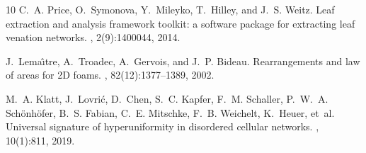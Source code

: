 \documentclass[10pt,twocolumn]{article}
\begin{document}
\begin{thebibliography}{10}
C.~A. Price, O.~Symonova, Y.~Mileyko, T.~Hilley, and J.~S. Weitz.
\newblock Leaf extraction and analysis framework toolkit: a software package for extracting leaf venation networks.
, 2(9):1400044, 2014.

J.~Lema{\^\i}tre, A.~Troadec, A.~Gervois, and J.~P. Bideau.
\newblock Rearrangements and law of areas for 2D foams.
, 82(12):1377--1389, 2002.

M.~A. Klatt, J.~Lovri{\'c}, D.~Chen, S.~C. Kapfer, F.~M. Schaller, P.~W.~A. Sch{\"o}nh{\"o}fer, B.~S. Fabian, C.~E. Mitschke, F.~B. Weichelt, K.~Heuer, et~al.
\newblock Universal signature of hyperuniformity in disordered cellular networks.
, 10(1):811, 2019.

\end{thebibliography}
\end{document}
